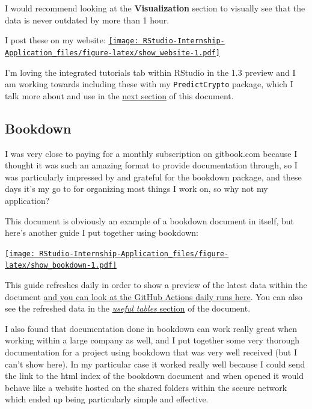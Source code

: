 \documentclass[
]{book}
\begin{document}
I would recommend looking at the \textbf{Visualization} section to visually see that the data is never outdated by more than 1 hour.

I post these on my website:
\href{https://predictcrypto.com/tutorials}{\texttt{[image: RStudio-Internship-Application\_files/figure-latex/show\_website-1.pdf]}}

I'm loving the integrated tutorials tab within RStudio in the 1.3 preview and I am working towards including these with my \texttt{PredictCrypto} package, which I talk more about and use in the \protect\hyperlink{ideal-projects}{next section} of this document.

\hypertarget{bookdown}{%
\subsection{Bookdown}\label{bookdown}}

I was very close to paying for a monthly subscription on gitbook.com because I thought it was such an amazing format to provide documentation through, so I was particularly impressed by and grateful for the bookdown \citep{R-bookdown} package, and these days it's my go to for organizing most things I work on, so why not my application?

This document is obviously an example of a bookdown document in itself, but here's another guide I put together using bookdown:

\href{https://predictcryptodb-quickstart.com/}{\texttt{[image: RStudio-Internship-Application\_files/figure-latex/show\_bookdown-1.pdf]}}

This guide refreshes daily in order to show a preview of the latest data within the document \href{https://github.com/ries9112/PredictCryptoDB/actions}{and you can look at the GitHub Actions daily runs here}. You can also see the refreshed data in the \href{https://predictcryptodb-quickstart.com/useful-tables.html}{\emph{useful tables} section} of the document.

I also found that documentation done in bookdown can work really great when working within a large company as well, and I put together some very thorough documentation for a project using bookdown that was very well received (but I can't show here). In my particular case it worked really well because I could send the link to the html index of the bookdown document and when opened it would behave like a website hosted on the shared folders within the secure network which ended up being particularly simple and effective.
\end{document}

